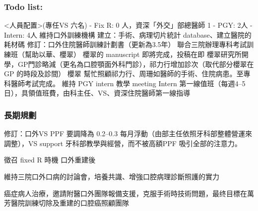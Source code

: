 \documentclass[t,24pt,aspectratio=169]{beamer}
\begin{document}
\begin{frame}[hoved]
\frametitle{Todo list:}
\begin{outline}
\1 <人員配置>(專任VS 六名) - Fix R: 0 人，資深「外交」部總醫師 1 - PGY: 2人
 - Intern: 4人
\1 維持口外訓練機構
\2 建立：手術、病理切片統計 database、建立醫院的耗材碼
\2 修訂：口外住院醫師訓練計劃書（更新為3.5年）
\2 聯合三院辦理專科考試訓練班（幫助以華、櫻翠）
    \3 櫻翠的 manuscript 即將完成，投稿在即
    \3 櫻翠研究所開學，GP門診略減（更名為口腔顎面外科門診），祁力行增加診次（取代部分櫻翠在GP 的時段及診間）
    \3 櫻翠 幫忙照顧祁力行、周珊如醫師的手術、住院病患。至專科醫師考試完成。
\1 維持 PGY intern 教學 meeting
\2 Intern 第一線值班（每週4--5日），具領值班費，由科主任、VS、資深住院醫師第一線指導



\end{outline}
\end{frame}

\begin{frame}[hoved]
\frametitle{長期規劃}
\begin{outline}
\1 修訂：口外VS PPF 要調降為 0.2--0.3 每月浮動（由部主任依照牙科部整體營運來調整），VS support 牙科部教學與經營，而不被高額PPF 吸引全部的注意力。

\1 徵召 fixed R 時機
    \2 口外重建後

\1 維持三院口外口病的討論會，培養共識、增強口腔病理診斷照護的實力

\1 癌症病人治療，邀請附醫口外團隊報備支援，克服手術時技術問題，最终目標在萬芳醫院訓練切除及重建的口腔癌照顧團隊
\end{outline}

\end{frame}



\end{document}
